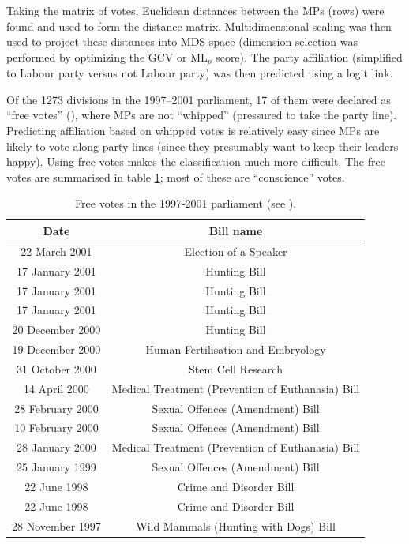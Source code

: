 Taking the matrix of votes, Euclidean distances between the MPs (rows) were found and used to form the distance matrix. Multidimensional scaling was then used to project these distances into MDS space (dimension selection was performed by optimizing the GCV or $\text{ML}_p$ score). The party affiliation (simplified to Labour party versus not Labour party) was then predicted using a logit link.

Of the 1273 divisions in the 1997--2001 parliament, 17 of them were declared  as ``free votes'' (\cite{freevotes}), where MPs are not ``whipped'' (pressured to take the party line). Predicting affiliation based on whipped votes is relatively easy since MPs are likely to vote along party lines (since they presumably want to keep their leaders happy). Using free votes makes the classification much more difficult. The free votes are summarised in table \ref{free-vote-description}; most of these are ``conscience'' votes.

\begin{table}  
\begin{centering}
\begin{tabular}{cc}
	Date & Bill name \\
    \hline
22 March 2001    &   Election of a Speaker \\
17 January 2001  &   Hunting Bill \\
17 January 2001  &   Hunting Bill \\
17 January 2001  &   Hunting Bill\\
20 December 2000 &   Hunting Bill \\
19 December 2000 &   Human Fertilisation and Embryology\\
31 October 2000  &   Stem Cell Research \\
14 April 2000    &   Medical Treatment (Prevention of Euthanasia) Bill \\
28 February 2000 &   Sexual Offences (Amendment) Bill \\
10 February 2000 &   Sexual Offences (Amendment) Bill \\
28 January 2000  &   Medical Treatment (Prevention of Euthanasia) Bill\\
25 January 1999  &   Sexual Offences (Amendment) Bill\\
22 June 1998     &  Crime and Disorder Bill \\
22 June 1998     &  Crime and Disorder Bill \\
28 November 1997 &  Wild Mammals (Hunting with Dogs) Bill\\
  \end{tabular}
\caption{Free votes in the 1997-2001 parliament (see \cite{freevotes}).}
\end{centering}
\label{free-vote-description}
\end{table}

